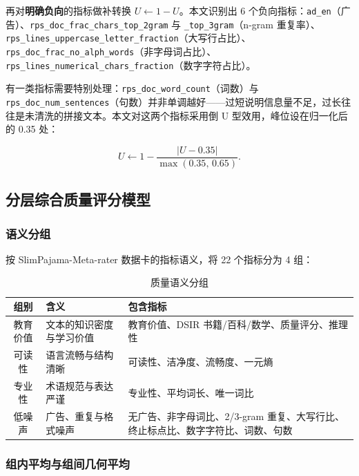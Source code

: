 再对\textbf{明确负向}的指标做补转换 $U\leftarrow1-U$。本文识别出 6 个负向指标：\texttt{ad\_en}（广告）、\texttt{rps\_doc\_frac\_chars\_top\_2gram} 与 \texttt{\_top\_3gram}（n-gram 重复率）、\texttt{rps\_lines\_uppercase\_letter\_fraction}（大写行占比）、\texttt{rps\_doc\_frac\_no\_alph\_words}（非字母词占比）、\texttt{rps\_lines\_numerical\_chars\_fraction}（数字字符占比）。

有一类指标需要特别处理：\texttt{rps\_doc\_word\_count}（词数）与 \texttt{rps\_doc\_num\_sentences}（句数）并非单调越好——过短说明信息量不足，过长往往是未清洗的拼接文本。本文对这两个指标采用倒 U 型效用，峰位设在归一化后的 0.35 处：

\begin{equation}
U \leftarrow 1-\frac{|U-0.35|}{\max(0.35,\,0.65)} .
\end{equation}

\subsection{分层综合质量评分模型}

\subsubsection{语义分组}

按 SlimPajama-Meta-rater 数据卡的指标语义，将 22 个指标分为 4 组：

\begin{table}[htbp]
\centering
\caption{质量语义分组}
\label{tab:qgroups}
\small
\begin{tabular}{c|l|l}
\toprule
\textbf{组别} & \textbf{含义} & \textbf{包含指标} \\
\midrule
教育价值 & 文本的知识密度与学习价值 & 教育价值、DSIR 书籍/百科/数学、质量评分、推理性 \\
可读性 & 语言流畅与结构清晰 & 可读性、洁净度、流畅度、一元熵 \\
专业性 & 术语规范与表达严谨 & 专业性、平均词长、唯一词比 \\
低噪声 & 广告、重复与格式噪声 & 无广告、非字母词比、2/3-gram 重复、大写行比、终止标点比、数字字符比、词数、句数 \\
\bottomrule
\end{tabular}
\end{table}

\subsubsection{组内平均与组间几何平均}

